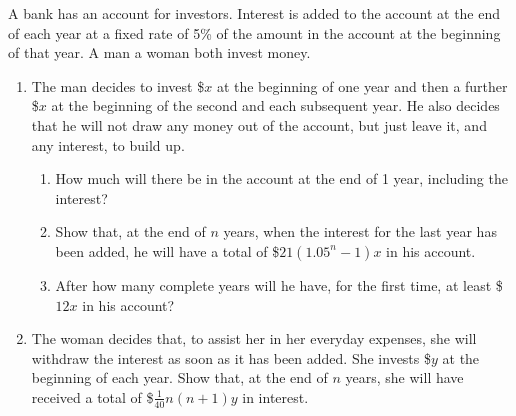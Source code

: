 \begin{problem}
    A bank has an account for investors. Interest is added to the account at the end of each year at a fixed rate of 5\% of the amount in the account at the beginning of that year. A man a woman both invest money.

    \begin{enumerate}
        \item The man decides to invest \$$x$ at the beginning of one year and then a further \$$x$ at the beginning of the second and each subsequent year. He also decides that he will not draw any money out of the account, but just leave it, and any interest, to build up. \begin{enumerate}
            \item How much will there be in the account at the end of 1 year, including the interest?
            \item Show that, at the end of $n$ years, when the interest for the last year has been added, he will have a total of \$$21(1.05^n - 1)x$ in his account.
            \item After how many complete years will he have, for the first time, at least \$$12x$ in his account?
        \end{enumerate}
        \item The woman decides that, to assist her in her everyday expenses, she will withdraw the interest as soon as it has been added. She invests \$$y$ at the beginning of each year. Show that, at the end of $n$ years, she will have received a total of \$$\frac1{40} n(n+1)y$ in interest.
    \end{enumerate}
\end{problem}
